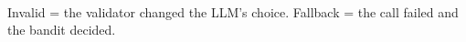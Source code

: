 \begin{table}[t]
\centering
\caption{Ordered options (773ad66). LLM decisions, simulated ``informed'' setting.}
\label{tab:e4_informed_llm}
\\[2pt]{\footnotesize Invalid = the validator changed the LLM's choice. Fallback = the call failed and the bandit decided.}
\end{table}
